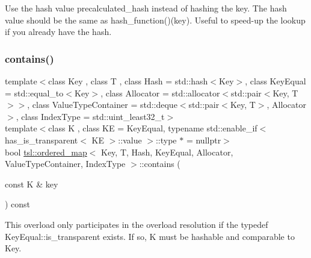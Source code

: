 Use the hash value \textquotesingle{}precalculated\+\_\+hash\textquotesingle{} instead of hashing the key. The hash value should be the same as hash\+\_\+function()(key). Useful to speed-\/up the lookup if you already have the hash. \mbox{\label{classtsl_1_1ordered__map_a62b1a90a19ebdacd4a69c64b38d0ad97}} 
\subsubsection{\texorpdfstring{contains()}{contains()}\hspace{0.1cm}{\footnotesize\ttfamily [2/3]}}
{\footnotesize\ttfamily template$<$class Key , class T , class Hash  = std\+::hash$<$\+Key$>$, class Key\+Equal  = std\+::equal\+\_\+to$<$\+Key$>$, class Allocator  = std\+::allocator$<$std\+::pair$<$\+Key, T$>$$>$, class Value\+Type\+Container  = std\+::deque$<$std\+::pair$<$\+Key, T$>$, Allocator$>$, class Index\+Type  = std\+::uint\+\_\+least32\+\_\+t$>$ \\
template$<$class K , class KE  = Key\+Equal, typename std\+::enable\+\_\+if$<$ has\+\_\+is\+\_\+transparent$<$ K\+E $>$\+::value $>$\+::type $\ast$  = nullptr$>$ \\
bool \mbox{\hyperlink{classtsl_1_1ordered__map}{tsl\+::ordered\+\_\+map}}$<$ Key, T, Hash, Key\+Equal, Allocator, Value\+Type\+Container, Index\+Type $>$\+::contains (\begin{DoxyParamCaption}\item[{const K \&}]{key }\end{DoxyParamCaption}) const\hspace{0.3cm}{\ttfamily [inline]}}

This overload only participates in the overload resolution if the typedef Key\+Equal\+::is\+\_\+transparent exists. If so, K must be hashable and comparable to Key. \mbox{\label{classtsl_1_1ordered__map_a0f9c85b500e88728e72e5a12f9a18fdc}} 
